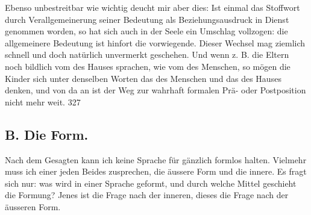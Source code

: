 Ebenso unbestreitbar wie wichtig deucht mir aber dies: Ist einmal das Stoffwort durch Verallgemeinerung seiner Bedeutung als Beziehungsausdruck in Dienst genommen worden, so hat sich auch in der Seele ein Umschlag vollzogen: die allgemeinere Bedeutung ist hinfort die vorwiegende. Dieser Wechsel mag ziemlich schnell und doch natürlich unvermerkt geschehen. Und wenn z. B. die Eltern noch bildlich vom  des Hauses sprachen, wie vom  des Menschen, so mögen die Kinder sich unter denselben Worten das  des Menschen und das  des Hauses denken, und von da an ist der Weg zur wahrhaft formalen Prä- oder Postposition nicht mehr weit.  {\textbar}{\textbar}327{\textbar}{\textbar}\label{sp.327} 

\label{fp.319}

\subsection*{}\label{IV.III.II.2}
\subsection*{B. Die Form.}
Nach dem Gesagten kann ich keine Sprache für gänzlich formlos halten. Vielmehr muss ich einer jeden Beides zusprechen, die äussere Form und die innere. Es fragt sich nur: was wird in einer Sprache geformt, und durch welche Mittel geschieht die Formung? Jenes ist die Frage nach der inneren, dieses die Frage nach der äusseren Form.

